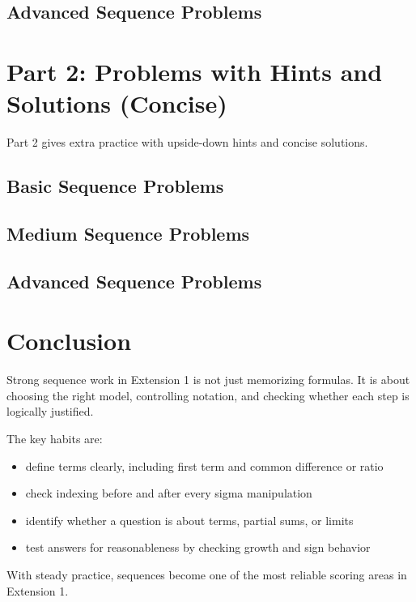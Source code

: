 \documentclass[12pt]{article}
\theoremstyle{definition}
\begin{document}
\subsection{Advanced Sequence Problems}


\newpage
\section{Part 2: Problems with Hints and Solutions (Concise)}
Part 2 gives extra practice with upside-down hints and concise solutions.

\subsection{Basic Sequence Problems}


\subsection{Medium Sequence Problems}


\subsection{Advanced Sequence Problems}


\newpage
\section{Conclusion}
Strong sequence work in Extension 1 is not just memorizing formulas. It is about choosing the right model, controlling notation, and checking whether each step is logically justified.

The key habits are:
\begin{itemize}[leftmargin=*]
  \item define terms clearly, including first term and common difference or ratio
  \item check indexing before and after every sigma manipulation
  \item identify whether a question is about terms, partial sums, or limits
  \item test answers for reasonableness by checking growth and sign behavior
\end{itemize}

With steady practice, sequences become one of the most reliable scoring areas in Extension 1.
\end{document}

